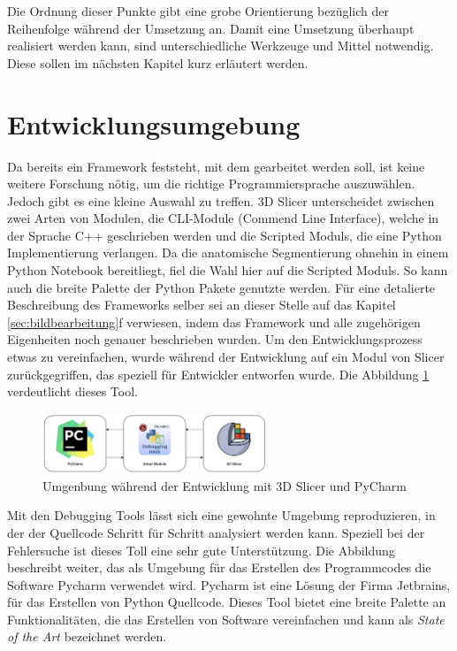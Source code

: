 Die Ordnung dieser Punkte gibt eine grobe Orientierung bezüglich der Reihenfolge
während der Umsetzung an. Damit eine Umsetzung überhaupt realisiert werden kann,
sind unterschiedliche Werkzeuge und Mittel notwendig. Diese sollen im nächsten
Kapitel kurz erläutert werden.

\section{Entwicklungsumgebung}
Da bereits ein Framework feststeht, mit dem gearbeitet werden soll, ist keine
weitere Forschung nötig, um die richtige Programmiersprache auszuwählen. Jedoch
gibt es eine kleine Auswahl zu treffen. 3D Slicer unterscheidet zwischen zwei Arten
von Modulen, die CLI-Module (Commend Line Interface), welche in der Sprache C++ geschrieben
werden und die Scripted Moduls, die eine Python Implementierung verlangen. Da die
anatomische Segmentierung ohnehin in einem Python Notebook bereitliegt, fiel die
Wahl hier auf die Scripted Moduls. So kann auch die breite Palette der Python Pakete
genutzte werden. Für eine detalierte Beschreibung des Frameworks selber sei an
dieser Stelle auf das Kapitel \ref{sec:bildbearbeitung}f verwiesen, indem das
Framework und alle zugehörigen Eigenheiten noch genauer beschrieben wurden. Um den
Entwicklungsprozess etwas zu vereinfachen, wurde während der Entwicklung auf ein
Modul von Slicer zurückgegriffen, das speziell für Entwickler entworfen wurde.
Die Abbildung \ref{fig:entwicklungsumgebung} verdeutlicht dieses Tool.

\begin{figure}[h]
	\centering
	\includegraphics[width=0.6\textwidth]{img/Entwicklungsumgebung.png}
	\caption{Umgenbung während der Entwicklung mit 3D Slicer und PyCharm}
	\label{fig:entwicklungsumgebung}
\end{figure}

Mit den Debugging Tools lässt sich eine gewohnte Umgebung reproduzieren, in der
der Quellcode Schritt für Schritt analysiert werden kann. Speziell bei der Fehlersuche
ist dieses Toll eine sehr gute Unterstützung. Die Abbildung beschreibt weiter, das
als Umgebung für das Erstellen des Programmcodes die Software Pycharm verwendet wird.
Pycharm ist eine Lösung der Firma Jetbrains, für das Erstellen von Python Quellcode.
Dieses Tool bietet eine breite Palette an Funktionalitäten, die das Erstellen von
Software vereinfachen und kann als \textit{State of the Art} bezeichnet werden.

